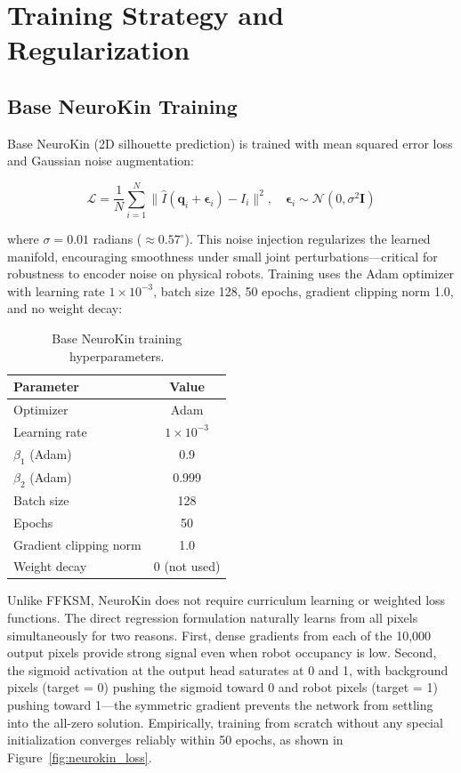 \documentclass[12pt,a4paper,oneside]{report}
\begin{document}
\section{Training Strategy and Regularization}

\subsection{Base NeuroKin Training}
\label{subsec:base_neurokin_training}

Base NeuroKin (2D silhouette prediction) is trained with mean squared error loss and Gaussian noise augmentation:

\begin{equation}
\mathcal{L} = \frac{1}{N} \sum_{i=1}^{N} \|\hat{I}(\mathbf{q}_i + \boldsymbol{\epsilon}_i) - I_i\|^2, \quad \boldsymbol{\epsilon}_i \sim \mathcal{N}(0, \sigma^2 \mathbf{I})
\end{equation}

where $\sigma = 0.01$ radians ($\approx 0.57^\circ$). This noise injection regularizes the learned manifold, encouraging smoothness under small joint perturbations—critical for robustness to encoder noise on physical robots. Training uses the Adam optimizer with learning rate $1 \times 10^{-3}$, batch size 128, 50 epochs, gradient clipping norm 1.0, and no weight decay:

\begin{table}[H]
\centering
\caption{Base NeuroKin training hyperparameters.}
\label{tab:neurokin_hyperparams}
\begin{tabular}{lc}
\toprule
Parameter & Value \\
\midrule
Optimizer & Adam \\
Learning rate & $1 \times 10^{-3}$ \\
$\beta_1$ (Adam) & 0.9 \\
$\beta_2$ (Adam) & 0.999 \\
Batch size & 128 \\
Epochs & 50 \\
Gradient clipping norm & 1.0 \\
Weight decay & 0 (not used) \\
\bottomrule
\end{tabular}
\end{table}

Unlike FFKSM, NeuroKin does not require curriculum learning or weighted loss functions. The direct regression formulation naturally learns from all pixels simultaneously for two reasons. First, dense gradients from each of the 10,000 output pixels provide strong signal even when robot occupancy is low. Second, the sigmoid activation at the output head saturates at 0 and 1, with background pixels (target = 0) pushing the sigmoid toward 0 and robot pixels (target = 1) pushing toward 1—the symmetric gradient prevents the network from settling into the all-zero solution. Empirically, training from scratch without any special initialization converges reliably within 50 epochs, as shown in Figure~\ref{fig:neurokin_loss}.
\end{document}
